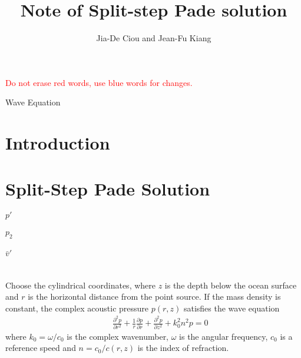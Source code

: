 \documentclass[journal,onecolumn]{IEEEtran}
\begin{document}
\title{Note of Split-step Pade solution}         
\author{Jia-De Ciou and Jean-Fu Kiang}        
\date{}          

\markboth{}{}

\maketitle

\begin{abstract}

\end{abstract}

\textcolor{red}{Do not erase red words, use blue words for changes.}


\begin{IEEEkeywords}
Wave Equation
\end{IEEEkeywords}

\section{Introduction}


\section{Split-Step Pade Solution}

$p'$ \\ \\ $p_2$ \\ \\ $\bar{v}'$ 
\\ \\  \\
Choose the cylindrical coordinates, where $z$ is the depth below the ocean surface and $r$ is the horizontal distance 
from the point source. 
If the mass density is constant, the complex acoustic pressure $p(r, z)$ satisfies the wave equation \cite{COA}
\begin{eqnarray}
&&\frac{\partial^2 p}{\partial r^2} + \frac{1}{r} \frac{\partial p}{\partial r}+ \frac{\partial^2 p}{\partial z^2} + k_0^2 n^2  p = 0
\label{eqn_0001}
\end{eqnarray}
where $k_0 = \omega / c_0$ is the complex wavenumber, $\omega$ is the angular frequency, $c_0$ is a reference speed 
and $n = c_0 / c(r, z)$ is the index of refraction.
\end{document}
